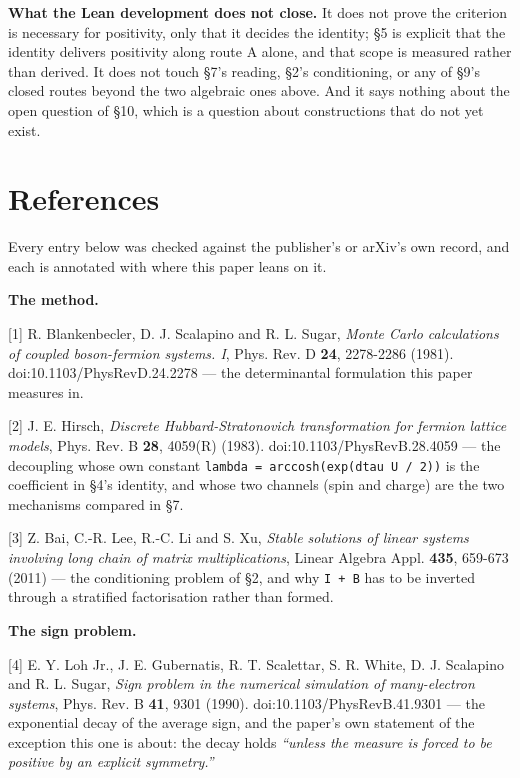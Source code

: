 \documentclass[10pt,letterpaper,twocolumn]{article}
\begin{document}
\textbf{What the Lean development does not close.} It does not prove the criterion is necessary for
positivity, only that it decides the identity; §5 is explicit that the identity delivers positivity
along route A alone, and that scope is measured rather than derived. It does not touch §7's reading,
§2's conditioning, or any of §9's closed routes beyond the two algebraic ones above. And it says
nothing about the open question of §10, which is a question about constructions that do not yet
exist.

\section{References}\label{references}

Every entry below was checked against the publisher's or arXiv's own record, and each is annotated
with where this paper leans on it.

\textbf{The method.}

{[}1{]} R. Blankenbecler, D. J. Scalapino and R. L. Sugar, \emph{Monte Carlo calculations of coupled
boson-fermion systems. I}, Phys. Rev. D \textbf{24}, 2278-2286 (1981).
doi:\allowbreak{}10.\allowbreak{}1103/\allowbreak{}PhysRevD\allowbreak{}.\allowbreak{}24.\allowbreak{}2278 --- the determinantal formulation this paper measures in.

{[}2{]} J. E. Hirsch, \emph{Discrete Hubbard-Stratonovich transformation for fermion lattice models},
Phys. Rev. B \textbf{28}, 4059(R) (1983). doi:\allowbreak{}10.\allowbreak{}1103/\allowbreak{}PhysRevB\allowbreak{}.\allowbreak{}28.\allowbreak{}4059 --- the decoupling whose own
constant \texttt{lambda\ =\allowbreak{}\ arccosh(\allowbreak{}exp(\allowbreak{}dtau\ U\ /\allowbreak{}\ 2)\allowbreak{})\allowbreak{}} is the coefficient in §4's identity, and whose two
channels (spin and charge) are the two mechanisms compared in §7.

{[}3{]} Z. Bai, C.-R. Lee, R.-C. Li and S. Xu, \emph{Stable solutions of linear systems involving long
chain of matrix multiplications}, Linear Algebra Appl. \textbf{435}, 659-673 (2011) --- the conditioning
problem of §2, and why \texttt{I\ +\allowbreak{}\ B} has to be inverted through a stratified factorisation rather than
formed.

\textbf{The sign problem.}

{[}4{]} E. Y. Loh Jr., J. E. Gubernatis, R. T. Scalettar, S. R. White, D. J. Scalapino and R. L.
Sugar, \emph{Sign problem in the numerical simulation of many-electron systems}, Phys. Rev. B \textbf{41},
9301 (1990). doi:\allowbreak{}10.\allowbreak{}1103/\allowbreak{}PhysRevB\allowbreak{}.\allowbreak{}41.\allowbreak{}9301 --- the exponential decay of the average sign, and the
paper's own statement of the exception this one is about: the decay holds \emph{``unless the measure is
forced to be positive by an explicit symmetry.''}
\end{document}
